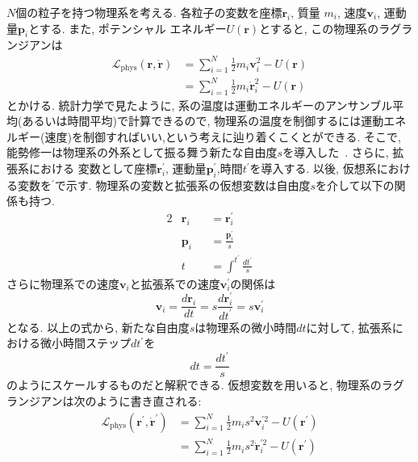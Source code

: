 $N$個の粒子を持つ物理系を考える. 各粒子の変数を座標$\bm{r}_{i}$, 質量
$m_{i}$, 速度$\bm{v}_{i}$, 運動量$\bm{p}_{i}$とする. また, ポテンシャル
エネルギー$U(\bm{r})$とすると, この物理系のラグランジアンは
\begin{align}
 \mathcal{L}_{\mathrm{phys}} (\bm{r}, \dot{\bm{r}})
 &= \sum_{i=1}^{N} \frac{1}{2} m_{i} \bm{v}_{i}^{2} - U(\bm{r})
 \\
 &= \sum_{i=1}^{N} \frac{1}{2} m_{i} \dot{\bm{r}}_{i}^{2} - U(\bm{r})
 \label{eq:NoseHoover1}
\end{align}
とかける. 統計力学で見たように, 系の温度は運動エネルギーのアンサンブル平均(あるいは時間平均)で計算できるので, 物理系の温度を制御するには運動エネルギー(速度)を制御すればいい,という考えに辿り着くこくとができる.
そこで, 能勢修一は物理系の外系として振る舞う新たな自由度$s$を導入した~\cite{1984Nose1, 1984Nose2}.
さらに, 拡張系における
変数として座標$\bm{r}^{\prime}_{i}$,
運動量$\bm{p}^{\prime}_{i}$,時間$t^{\prime}$を導入する.
以後, 仮想系における変数を$^{\prime}$で示す.
物理系の変数と拡張系の仮想変数は自由度$s$を介して以下の関係も持つ.
\begin{alignat}{2}
 &\bm{r}_{i} &&= \bm{r}^{\prime}_{i}
 \label{eq:NoseHoover2.1}
 \\
 &\bm{p}_{i} &&= \frac{\bm{p}^{\prime}_{i}}{s}
 \label{eq:NoseHoover2.2}
 \\
 &t              &&= \int^{t^{\prime}} \frac{dt^{\prime}}{s}
 \label{eq:NoseHoover2.3}
\end{alignat}
さらに物理系での速度$\bm{v}_{i}$と拡張系での速度$\bm{v}_{i}^{\prime}$の関係は
\begin{equation}
      \bm{v}_{i}
  =   \frac{d \bm{r}_{i}}{d t}
  = s \frac{d \bm{r}^{\prime}_{i}}{d t^{\prime}}
  = s \bm{v}_{i}^{\prime}
  \label{eq:NoseHoover3}
\end{equation}
となる.
以上の式から, 新たな自由度$s$は物理系の微小時間$dt$に対して, 拡張系における微小時間ステップ$dt^{\prime}$を
\begin{equation}
 dt = \frac{dt^{\prime}}{s}
 \label{eq:NoseHoover4}
\end{equation}
のようにスケールするものだと解釈できる.
仮想変数を用いると, 物理系のラグランジアンは次のように書き直される:
\begin{align}
 \mathcal{L}_{\mathrm{phys}}(\bm{r}^{\prime},\dot{\bm{r}}^{\prime})
  &=
  \sum_{i=1}^{N}
  \frac{1}{2} m_{i} s^{2} {\bm{v}_{i}^{\prime 2}}
  -
  U(\bm{r}^{\prime})
  \\
  &=
  \sum_{i=1}^{N}
  \frac{1}{2} m_{i} s^{2} {\dot{\bm{r}}_{i}^{\prime 2}}
  -
  U(\bm{r}^{\prime})
  \label{eq:NoseHoover5}
\end{align}
